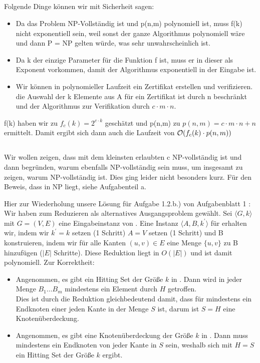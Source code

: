 \documentclass[a4paper]{article}
\begin{document}
		\subsection{}
		Folgende Dinge können wir mit Sicherheit sagen:
		\begin{itemize}
		\item Da das Problem NP-Vollständig ist und p(n,m) polynomiell ist, muss f(k) nicht exponentiell sein, weil sonst der ganze Algorithmus polynomiell wäre und dann P = NP gelten würde, was sehr unwahrscheinlich ist.
		\item Da k der einzige Parameter für die Funktion f ist, muss er in dieser als Exponent vorkommen, damit der Algorithmus exponentiell in der Eingabe ist.
		\item Wir können in polynomieller Laufzeit ein Zertifikat erstellen und verifizieren. die Auswahl der k Elemente aus A für ein Zertifikat ist durch n beschränkt und der Algorithmus zur Verifikation durch $c\cdot m\cdot n$. 
		\end{itemize}
		f(k) haben wir zu $f_c(k) = 2^{c \cdot k}$ geschätzt und  p(n,m) zu
		$p(n,m) = c\cdot m\cdot n + n$ ermittelt. Damit ergibt sich dann auch die Laufzeit von $\mathcal{O}(f_c(k) \cdot p(n,m))$
		
		
		\subsection{}
		Wir wollen zeigen, dass \twohitset mit dem kleinsten erlaubten c NP-vollständig ist und dann begründen, warum \cpohitset ebenfalls NP-vollständig sein muss, um insgesamt zu zeigen, warum \chitset NP-vollständig ist. Dies ging leider nicht besonders kurz. Für den Beweis, dass \chitset in NP liegt, siehe Aufgabenteil a. \n
		
Hier zur Wiederholung unsere Lösung für Aufgabe 1.2.b.) von Aufgabenblatt 1 : \n
Wir haben zum Reduzieren als alternatives Ausgangsproblem \vertexcover gewählt.\n
			Sei $ \langle G, k \rangle $ mit $ G = (V, E)$ eine Eingabeinstanz von \vertexcover. Eine Instanz $ \langle A,B, k^\prime \rangle $ für \hitset erhalten wir, indem wir $k^\prime = k$ setzen (1 Schritt) $A=V$ setzen (1 Schritt) und B konstruieren, indem wir für alle Kanten $(u,v) \in E$ eine Menge $\{u,v\}$ zu B hinzufügen ($|E|$ Schritte).\n
			Diese Reduktion liegt in $O(|E|)$ und ist damit polynomiell.\n
			Zur Korrektheit:
			\begin{itemize}
				\item Angenommen, es gibt ein Hitting Set der Größe $k$ in \hitset. Dann wird in jeder Menge $B_1 \dots B_m$ mindestens ein Element durch $H$ getroffen. \\
				Dies ist durch die Reduktion gleichbedeutend damit, dass für \vertexcover mindestens ein Endknoten einer jeden Kante in der Menge $S$ ist, darum ist $S = H$ eine Knotenüberdeckung.
				\item Angenommen, es gibt eine Knotenüberdeckung der Größe $k$ in \vertexcover. Dann muss mindestens ein Endknoten von jeder Kante in $S$ sein, weshalb sich mit $H = S$ ein Hitting Set der Größe $k$ ergibt.
			\end{itemize}
\end{document}
